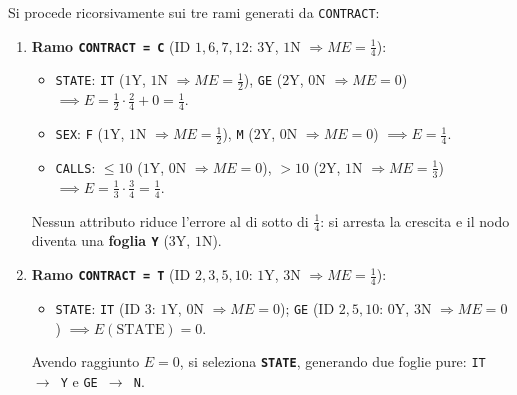 Si procede ricorsivamente sui tre rami generati da \texttt{CONTRACT}:
\begin{enumerate}
    \item \textbf{Ramo \texttt{CONTRACT = C}} (ID $1,6,7,12$: $3$Y, $1$N $\Rightarrow ME = \frac{1}{4}$):
    \begin{itemize}
        \item \texttt{STATE}: \texttt{IT} ($1$Y, $1$N $\Rightarrow ME = \frac{1}{2}$), \texttt{GE} ($2$Y, $0$N $\Rightarrow ME = 0$) $\implies E = \frac{1}{2}\cdot\frac{2}{4} + 0 = \frac{1}{4}$.
        \item \texttt{SEX}: \texttt{F} ($1$Y, $1$N $\Rightarrow ME = \frac{1}{2}$), \texttt{M} ($2$Y, $0$N $\Rightarrow ME = 0$) $\implies E = \frac{1}{4}$.
        \item \texttt{CALLS}: $\le 10$ ($1$Y, $0$N $\Rightarrow ME = 0$), $> 10$ ($2$Y, $1$N $\Rightarrow ME = \frac{1}{3}$) $\implies E = \frac{1}{3}\cdot\frac{3}{4} = \frac{1}{4}$.
    \end{itemize}
    Nessun attributo riduce l'errore al di sotto di $\frac{1}{4}$: si arresta la crescita e il nodo diventa una \textbf{foglia \texttt{Y}} ($3$Y, $1$N).

    \item \textbf{Ramo \texttt{CONTRACT = T}} (ID $2,3,5,10$: $1$Y, $3$N $\Rightarrow ME = \frac{1}{4}$):
    \begin{itemize}
        \item \texttt{STATE}: \texttt{IT} (ID $3$: $1$Y, $0$N $\Rightarrow ME = 0$); \texttt{GE} (ID $2,5,10$: $0$Y, $3$N $\Rightarrow ME = 0$) $\implies E(\text{STATE}) = 0$.
    \end{itemize}
    Avendo raggiunto $E = 0$, si seleziona \textbf{\texttt{STATE}}, generando due foglie pure: \texttt{IT $\rightarrow$ Y} e \texttt{GE $\rightarrow$ N}.


\end{enumerate}
